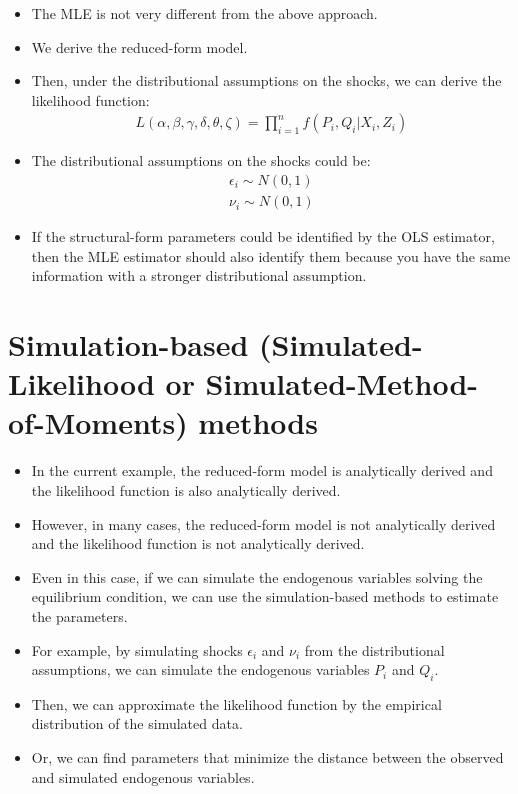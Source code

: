 \documentclass[
]{book}
\providecommand{\tightlist}{%
  \setlength{\itemsep}{0pt}\setlength{\parskip}{0pt}}
\begin{document}
\begin{itemize}
\tightlist
\item
  The MLE is not very different from the above approach.
\item
  We derive the reduced-form model.
\item
  Then, under the distributional assumptions on the shocks, we can derive the likelihood function:
  \begin{align}
    L(\alpha, \beta, \gamma, \delta, \theta, \zeta) = \prod_{i=1}^n f(P_i, Q_i | X_i, Z_i)
  \end{align}
\item
  The distributional assumptions on the shocks could be:
  \begin{align}
    \epsilon_i \sim N(0, 1) \\
    \nu_i \sim N(0, 1)
  \end{align}
\item
  If the structural-form parameters could be identified by the OLS estimator, then the MLE estimator should also identify them because you have the same information with a stronger distributional assumption.
\end{itemize}

\hypertarget{simulation-based-simulated-likelihood-or-simulated-method-of-moments-methods}{%
\section{Simulation-based (Simulated-Likelihood or Simulated-Method-of-Moments) methods}\label{simulation-based-simulated-likelihood-or-simulated-method-of-moments-methods}}

\begin{itemize}
\tightlist
\item
  In the current example, the reduced-form model is analytically derived and the likelihood function is also analytically derived.
\item
  However, in many cases, the reduced-form model is not analytically derived and the likelihood function is not analytically derived.
\item
  Even in this case, if we can simulate the endogenous variables solving the equilibrium condition, we can use the simulation-based methods to estimate the parameters.
\item
  For example, by simulating shocks \(\epsilon_i\) and \(\nu_i\) from the distributional assumptions, we can simulate the endogenous variables \(P_i\) and \(Q_i\).
\item
  Then, we can approximate the likelihood function by the empirical distribution of the simulated data.
\item
  Or, we can find parameters that minimize the distance between the observed and simulated endogenous variables.
\end{itemize}
\end{document}
